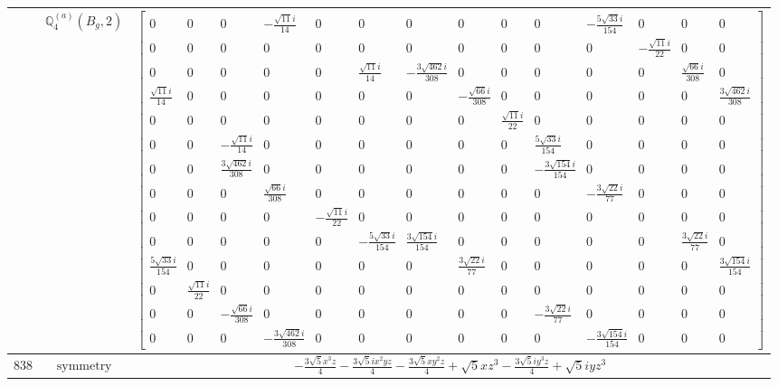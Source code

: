 \documentclass[fleqn,8pt,landscape]{jsarticle}
\begin{document}
\begin{longtable}{ccc}
$  $ & $ \mathbb{Q}_{4}^{(a)}(B_{g},2) $ & $ \begin{bmatrix} 0 & 0 & 0 & - \frac{\sqrt{11} i}{14} & 0 & 0 & 0 & 0 & 0 & 0 & - \frac{5 \sqrt{33} i}{154} & 0 & 0 & 0 \\ 0 & 0 & 0 & 0 & 0 & 0 & 0 & 0 & 0 & 0 & 0 & - \frac{\sqrt{11} i}{22} & 0 & 0 \\ 0 & 0 & 0 & 0 & 0 & \frac{\sqrt{11} i}{14} & - \frac{3 \sqrt{462} i}{308} & 0 & 0 & 0 & 0 & 0 & \frac{\sqrt{66} i}{308} & 0 \\ \frac{\sqrt{11} i}{14} & 0 & 0 & 0 & 0 & 0 & 0 & - \frac{\sqrt{66} i}{308} & 0 & 0 & 0 & 0 & 0 & \frac{3 \sqrt{462} i}{308} \\ 0 & 0 & 0 & 0 & 0 & 0 & 0 & 0 & \frac{\sqrt{11} i}{22} & 0 & 0 & 0 & 0 & 0 \\ 0 & 0 & - \frac{\sqrt{11} i}{14} & 0 & 0 & 0 & 0 & 0 & 0 & \frac{5 \sqrt{33} i}{154} & 0 & 0 & 0 & 0 \\ 0 & 0 & \frac{3 \sqrt{462} i}{308} & 0 & 0 & 0 & 0 & 0 & 0 & - \frac{3 \sqrt{154} i}{154} & 0 & 0 & 0 & 0 \\ 0 & 0 & 0 & \frac{\sqrt{66} i}{308} & 0 & 0 & 0 & 0 & 0 & 0 & - \frac{3 \sqrt{22} i}{77} & 0 & 0 & 0 \\ 0 & 0 & 0 & 0 & - \frac{\sqrt{11} i}{22} & 0 & 0 & 0 & 0 & 0 & 0 & 0 & 0 & 0 \\ 0 & 0 & 0 & 0 & 0 & - \frac{5 \sqrt{33} i}{154} & \frac{3 \sqrt{154} i}{154} & 0 & 0 & 0 & 0 & 0 & \frac{3 \sqrt{22} i}{77} & 0 \\ \frac{5 \sqrt{33} i}{154} & 0 & 0 & 0 & 0 & 0 & 0 & \frac{3 \sqrt{22} i}{77} & 0 & 0 & 0 & 0 & 0 & \frac{3 \sqrt{154} i}{154} \\ 0 & \frac{\sqrt{11} i}{22} & 0 & 0 & 0 & 0 & 0 & 0 & 0 & 0 & 0 & 0 & 0 & 0 \\ 0 & 0 & - \frac{\sqrt{66} i}{308} & 0 & 0 & 0 & 0 & 0 & 0 & - \frac{3 \sqrt{22} i}{77} & 0 & 0 & 0 & 0 \\ 0 & 0 & 0 & - \frac{3 \sqrt{462} i}{308} & 0 & 0 & 0 & 0 & 0 & 0 & - \frac{3 \sqrt{154} i}{154} & 0 & 0 & 0 \end{bmatrix} $ \\ \hline
$ 838 $ & $ \text{symmetry} $ & $ - \frac{3 \sqrt{5} x^{3} z}{4} - \frac{3 \sqrt{5} i x^{2} y z}{4} - \frac{3 \sqrt{5} x y^{2} z}{4} + \sqrt{5} x z^{3} - \frac{3 \sqrt{5} i y^{3} z}{4} + \sqrt{5} i y z^{3} $ \\

\end{longtable}
\end{document}
